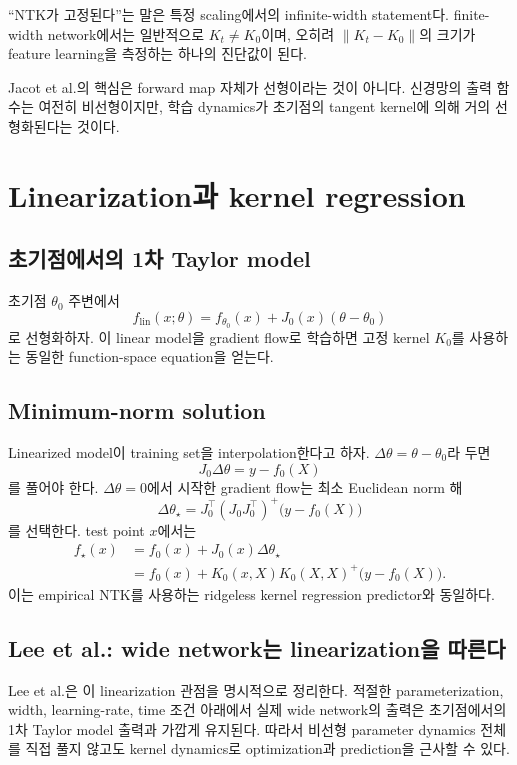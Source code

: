 \documentclass[11pt,a4paper,oneside,openany]{memoir}
\theoremstyle{definition}
\begin{document}
\begin{warningbox}
``NTK가 고정된다''는 말은 특정 scaling에서의 infinite-width statement다. finite-width network에서는 일반적으로 $K_t\neq K_0$이며, 오히려 $\|K_t-K_0\|$의 크기가 feature learning을 측정하는 하나의 진단값이 된다.
\end{warningbox}

\begin{presentbox}
Jacot et al.의 핵심은 forward map 자체가 선형이라는 것이 아니다. 신경망의 출력 함수는 여전히 비선형이지만, 학습 dynamics가 초기점의 tangent kernel에 의해 거의 선형화된다는 것이다.
\end{presentbox}

\chapter{Linearization과 kernel regression}
\section{초기점에서의 1차 Taylor model}
초기점 $\theta_0$ 주변에서
\[
f_{\mathrm{lin}}(x;\theta)
=f_{\theta_0}(x)+J_0(x)(\theta-\theta_0)
\]
로 선형화하자. 이 linear model을 gradient flow로 학습하면 고정 kernel $K_0$를 사용하는 동일한 function-space equation을 얻는다.

\section{Minimum-norm solution}
Linearized model이 training set을 interpolation한다고 하자. $\Delta\theta=\theta-\theta_0$라 두면
\[
J_0\Delta\theta=y-f_0(X)
\]
를 풀어야 한다. $\Delta\theta=0$에서 시작한 gradient flow는 최소 Euclidean norm 해
\[
\Delta\theta_\star
=J_0^\top(J_0J_0^\top)^+\bigl(y-f_0(X)\bigr)
\]
를 선택한다. test point $x$에서는
\begin{align*}
f_\star(x)
&=f_0(x)+J_0(x)\Delta\theta_\star\\
&=f_0(x)+K_0(x,X)K_0(X,X)^+\bigl(y-f_0(X)\bigr).
\end{align*}
이는 empirical NTK를 사용하는 ridgeless kernel regression predictor와 동일하다.

\section{Lee et al.: wide network는 linearization을 따른다}
Lee et al.은 이 linearization 관점을 명시적으로 정리한다. 적절한 parameterization, width, learning-rate, time 조건 아래에서 실제 wide network의 출력은 초기점에서의 1차 Taylor model 출력과 가깝게 유지된다. 따라서 비선형 parameter dynamics 전체를 직접 풀지 않고도 kernel dynamics로 optimization과 prediction을 근사할 수 있다.
\end{document}
